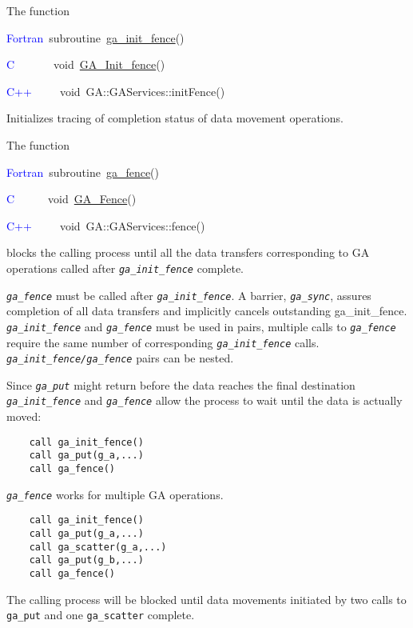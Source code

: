 The function

\textcolor{blue}{Fortran}~subroutine~\href{https://hpc.pnl.gov/globalarrays/api/f_op_api.html\#ga_init_fence}{ga\_{}init\_{}fence}()~

\textcolor{blue}{C}~~~~~~~void~\href{https://hpc.pnl.gov/globalarrays/api/c_op_api.html\#ga_init_fence}{GA\_{}Init\_{}fence}()~

\textcolor{blue}{C++}~~~~~void~GA::GAServices::initFence()

Initializes tracing of completion status of data movement operations.

The function

\textcolor{blue}{Fortran}~subroutine~\href{https://hpc.pnl.gov/globalarrays/api/f_op_api.html\#ga_fence}{ga\_{}fence}()~

\textcolor{blue}{C}\textcolor{blue}{\underbar{~}}~~~~~~void~\href{https://hpc.pnl.gov/globalarrays/api/c_op_api.html\#ga_fence}{GA\_{}Fence}()~

\textcolor{blue}{C++}~~~~~void~GA::GAServices::fence()

blocks the calling process until all the data transfers corresponding
to GA operations called after \texttt{\emph{ga\_init\_fence}} complete.

\texttt{\emph{ga\_fence}} must be called after \texttt{\emph{ga\_init\_fence}}.
A barrier, \texttt{\emph{ga\_sync}}, assures completion of all data
transfers and implicitly cancels outstanding ga\_init\_fence. \texttt{\emph{ga\_init\_fence}}
and \texttt{\emph{ga\_fence}} must be used in pairs, multiple calls
to \texttt{\emph{ga\_fence}} require the same number of corresponding
\texttt{\emph{ga\_init\_fence}} calls. \texttt{\emph{ga\_init\_fence/ga\_fence}}
pairs can be nested.

\textit{}

Since \texttt{\emph{ga\_put}} might return before the data reaches
the final destination \texttt{\emph{ga\_init\_fence}} and \texttt{\emph{ga\_fence}}
allow the process to wait until the data is actually moved:
\begin{verbatim}
    call ga_init_fence()
    call ga_put(g_a,...)
    call ga_fence()
\end{verbatim}
\textit{}

\texttt{\emph{ga\_fence}} works for multiple GA operations.
\begin{verbatim}
    call ga_init_fence()
    call ga_put(g_a,...)
    call ga_scatter(g_a,...)
    call ga_put(g_b,...)
    call ga_fence()
\end{verbatim}
The calling process will be blocked until data movements initiated
by two calls to \texttt{ga\_put} and one \texttt{ga\_scatter} complete. 


